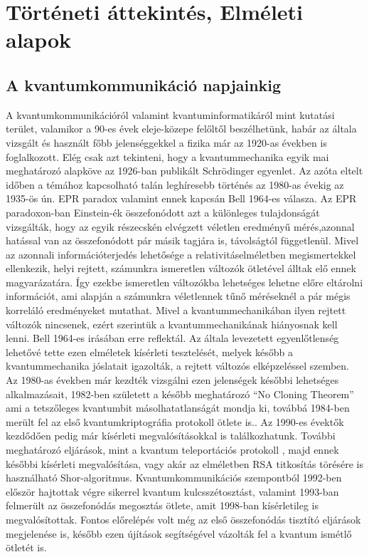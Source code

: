 \chapter{Történeti áttekintés, Elméleti alapok}

\section{A kvantumkommunikáció napjainkig}

A kvantumkommunikációról valamint kvantuminformatikáról mint kutatási terület, valamikor a 90-es évek eleje-közepe felőltől beszélhetünk, habár az általa vizsgált  és használt főbb jelenséggekkel a fizika már az 1920-as években is foglalkozott. Elég csak azt tekinteni, hogy a kvantummechanika egyik mai meghatározó alapköve az 1926-ban publikált Schrödinger egyenlet.\cite{schrodinger1926undulatory} Az azóta eltelt időben a témához kapcsolható talán leghíresebb történés az 1980-as évekig az 1935-ös ún. EPR paradox\cite{einstein1935can} valamint ennek kapcsán Bell 1964-es válasza\cite{bellt1964einstein}. Az EPR paradoxon-ban Einstein-ék összefonódott azt a különleges tulajdonságát vizsgálták, hogy az egyik részecskén elvégzett véletlen eredményű mérés,azonnal hatással van az összefonódott pár másik tagjára is, távolságtól függetlenül.  Mivel az azonnali információterjedés lehetősége a relativitáselméletben megismertekkel ellenkezik, helyi rejtett, számunkra ismeretlen változók ötletével álltak elő ennek magyarázatára. Így ezekbe ismeretlen változókba lehetséges lehetne előre eltárolni információt, ami alapján a számunkra véletlennek tűnő méréseknél a pár mégis korreláló eredményeket mutathat. Mivel a kvantummechanikában ilyen rejtett változók nincsenek, ezért szerintük a kvantummechanikának hiányosnak kell lenni. Bell 1964-es irásában erre reflektál. Az általa levezetett egyenlőtlenség lehetővé tette ezen elméletek kísérleti tesztelését, melyek később a kvantummechanika jóslatait igazolták, a rejtett változós elképzeléssel szemben.\\
 Az 1980-as években már kezdték vizsgálni ezen jelenségek későbbi lehetséges alkalmazásait, 1982-ben született a később meghatározó ``No Cloning Theorem''\cite{wootters1982single} ami a tetszőleges kvantumbit másolhatatlanságát mondja ki, továbbá 1984-ben merült fel az első kvantumkriptográfia protokoll ötlete is.\cite{BB84}. Az 1990-es évektők kezdődően pedig már kísérleti megvalósításokkal is találkozhatunk. További meghatározó eljárások, mint a kvantum teleportációs protokoll \cite{bennett1993teleporting}, majd ennek későbbi kísérleti megvalósítása\cite{bouwmeester1997experimental}, vagy akár az elméletben RSA titkosítás törésére is használható Shor-algoritmus.\cite{shor1999polynomial} Kvantumkommunikációs szempontból 1992-ben először hajtottak végre sikerrel kvantum kulcsszétosztást\cite{bennett1992experimental}, valamint 1993-ban felmerült az összefonódás megosztás ötlete\cite{zukowski1993event}, amit 1998-ban kísérletileg is megvalósítottak.\cite{pan1998experimental} Fontos előrelépés volt még az első összefonódás tisztító eljárások\cite{bennett1996purification} megjelenése is, később ezen újítások segítségével vázolták fel a kvantum ismétlő ötletét is\cite{briegel1998quantum}. \\
